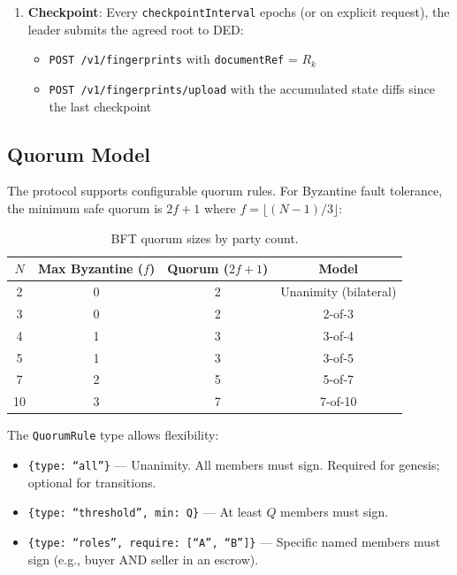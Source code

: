 \documentclass[11pt,a4paper]{article}
\begin{document}
\begin{enumerate}[nosep]
  \item \textbf{Checkpoint}: Every \texttt{checkpointInterval} epochs (or on
    explicit request), the leader submits the agreed root to DED:
    \begin{itemize}[nosep]
      \item \texttt{POST /v1/fingerprints} with \texttt{documentRef} = $R_k$
      \item \texttt{POST /v1/fingerprints/upload} with the accumulated state
        diffs since the last checkpoint
    \end{itemize}
\end{enumerate}


\subsection{Quorum Model}
\label{sec:quorum}

The protocol supports configurable quorum rules. For Byzantine fault tolerance,
the minimum safe quorum is $2f+1$ where $f = \lfloor(N-1)/3\rfloor$:

\begin{table}[H]
\centering
\begin{tabular}{cccc}
\toprule
$N$ & Max Byzantine ($f$) & Quorum ($2f+1$) & Model \\
\midrule
2 & 0 & 2 & Unanimity (bilateral) \\
3 & 0 & 2 & 2-of-3 \\
4 & 1 & 3 & 3-of-4 \\
5 & 1 & 3 & 3-of-5 \\
7 & 2 & 5 & 5-of-7 \\
10 & 3 & 7 & 7-of-10 \\
\bottomrule
\end{tabular}
\caption{BFT quorum sizes by party count.}
\label{tab:quorum}
\end{table}

\noindent The \texttt{QuorumRule} type allows flexibility:

\begin{itemize}[nosep]
  \item \texttt{\{type: ``all''\}} --- Unanimity. All members must sign.
    Required for genesis; optional for transitions.
  \item \texttt{\{type: ``threshold'', min: Q\}} --- At least $Q$ members
    must sign.
  \item \texttt{\{type: ``roles'', require: [``A'', ``B'']\}} --- Specific
    named members must sign (e.g., buyer AND seller in an escrow).
\end{itemize}
\end{document}
